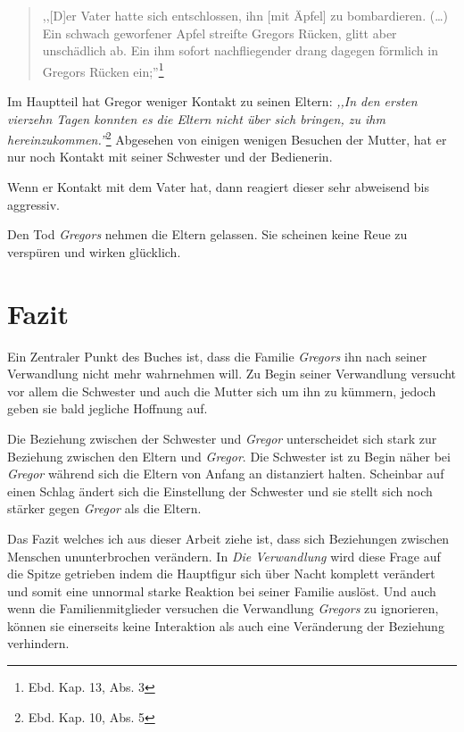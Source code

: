 \documentclass[12pt,a4paper,twoside,titlepage]{article}
\let\oldsection\section
\renewcommand\section{\clearpage\oldsection}
\begin{document}
	\begin{quote}
		,,[D]er Vater hatte sich entschlossen, ihn [mit Äpfel] zu bombardieren. (\dots) Ein schwach geworfener Apfel streifte Gregors Rücken, glitt aber unschädlich ab. Ein ihm sofort nachfliegender drang dagegen förmlich in Gregors Rücken ein;''\footnote{Ebd. Kap. 13, Abs. 3}
	\end{quote}
	
	
	
	Im Hauptteil hat Gregor weniger Kontakt zu seinen Eltern: \textit{,,In den ersten vierzehn Tagen konnten es die Eltern nicht über sich bringen, zu ihm hereinzukommen.''}\footnote{Ebd. Kap. 10, Abs. 5} Abgesehen von einigen wenigen Besuchen der Mutter, hat er nur noch Kontakt mit seiner Schwester und der Bedienerin.
	
	Wenn er Kontakt mit dem Vater hat, dann reagiert dieser sehr abweisend bis aggressiv.
	
	Den Tod \textit{Gregors} nehmen die Eltern gelassen. Sie scheinen keine Reue zu verspüren und wirken glücklich.
	
	\section{Fazit}
	
        Ein Zentraler Punkt des Buches ist, dass die Familie \textit{Gregors} ihn nach seiner Verwandlung nicht mehr wahrnehmen will. Zu Begin seiner Verwandlung versucht vor allem die Schwester und auch die Mutter sich um ihn zu kümmern, jedoch geben sie bald jegliche Hoffnung auf. 

        Die Beziehung zwischen der Schwester und \textit{Gregor} unterscheidet sich stark zur Beziehung zwischen den Eltern und \textit{Gregor}. Die Schwester ist zu Begin näher bei \textit{Gregor} während sich die Eltern von Anfang an distanziert halten. Scheinbar auf einen Schlag ändert sich die Einstellung der Schwester und sie stellt sich noch stärker gegen \textit{Gregor} als die Eltern.

        Das Fazit welches ich aus dieser Arbeit ziehe ist, dass sich Beziehungen zwischen Menschen ununterbrochen verändern. In \textit{Die Verwandlung} wird diese Frage auf die Spitze getrieben indem die Hauptfigur sich über Nacht komplett verändert und somit eine unnormal starke Reaktion bei seiner Familie auslöst. Und auch wenn die Familienmitglieder versuchen die Verwandlung \textit{Gregors} zu ignorieren, können sie einerseits keine Interaktion als auch eine Veränderung der Beziehung verhindern. 
		
\end{document}
